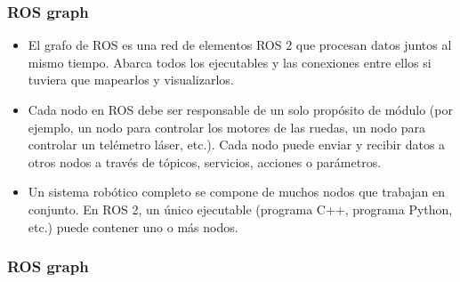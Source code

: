 \begin{frame}
    \frametitle{ROS graph}
    
    \begin{itemize}
    \item El grafo de ROS es una red de elementos ROS 2 que procesan datos juntos al mismo tiempo. Abarca todos los ejecutables y las conexiones entre ellos si tuviera que mapearlos y visualizarlos.

    \item Cada nodo en ROS debe ser responsable de un solo propósito de módulo (por ejemplo, un nodo para controlar los motores de las ruedas, un nodo para controlar un telémetro láser, etc.). Cada nodo puede enviar y recibir datos a otros nodos a través de tópicos, servicios, acciones o parámetros.

    \item Un sistema robótico completo se compone de muchos nodos que trabajan en conjunto. En ROS 2, un único ejecutable (programa C++, programa Python, etc.) puede contener uno o más nodos.
    \end{itemize}
    

\end{frame}

\begin{frame}[fragile]
	\frametitle{ROS graph}
	
	\begin{center}
	\end{center}
	
\end{frame}


